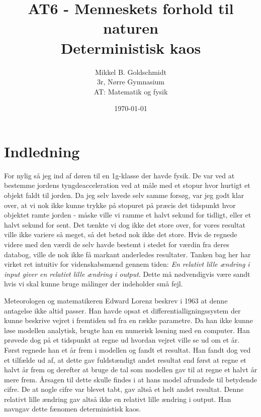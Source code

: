 \documentclass[10pt,a4paper]{article}
\author{Mikkel B. Goldschmidt\\ 3r, Nørre Gymnasium \\ AT: Matematik og fysik}
\title{AT6 - Menneskets forhold til naturen \\ Deterministisk kaos}
\date{\today}
\theoremstyle{break}
\theoremstyle{nonumberplain}
\begin{document}
\maketitle

\section{Indledning}
For nylig så jeg ind af døren til en 1g-klasse der havde fysik. 
De var ved at bestemme jordens tyngdeacceleration ved at måle med et stopur hvor hurtigt et objekt faldt til jorden. 
Da jeg selv lavede selv samme forsøg, var jeg godt klar over, at vi nok ikke kunne trykke på stopuret på præcis det tidspunkt hvor objektet ramte jorden - måske ville vi ramme et halvt sekund for tidligt, eller et halvt sekund for sent. 
Det tænkte vi dog ikke det store over, for vores resultat ville ikke variere så meget, så det betød nok ikke det store. 
Hvis de regnede videre med den værdi de selv havde bestemt i stedet for værdin fra deres databog, ville de nok ikke få markant anderledes resultater. 
Tanken bag her har virket ret intuitiv for videnskabsmænd gennem tiden: 
\textit{En relativt lille ændring i input giver en relativt lille ændring i output}.
Dette må nødvendigvis være sandt hvis vi skal kunne bruge målinger der indeholder små fejl.

Meteorologen og matematikeren Edward Lorenz beskrev i 1963 at denne antagelse ikke altid passer. 
Han havde opsat et differentialligningssystem der kunne beskrive vejret i fremtiden ud fra en række parametre. 
Da han ikke kunne løse modellen analytisk, brugte han en numerisk løsning med en computer. 
Han prøvede dog på et tidspunkt at regne ud hvordan vejret ville se ud om et år. 
Først regnede han et år frem i modellen og fandt et resultat. 
Han fandt dog ved et tilfælde ud af, at dette gav fuldstændigt andet resultat end først at regne et halvt år frem og derefter at bruge de tal som modellen gav til at regne et halvt år mere frem.
Årsagen til dette skulle findes i at hans model afrundede til betydende cifre. 
De at nogle cifre var blevet tabt, gav altså et helt andet resultat. 
Denne relativt lille ændring gav altså ikke en relativt lille ændring i output. 
Han navngav dette fænomen deterministisk kaos.
\end{document}
